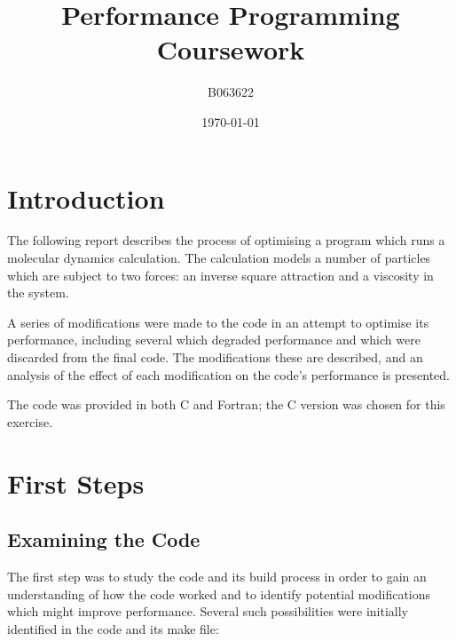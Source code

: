 \documentclass[11pt, oneside]{article}   %
\title{Performance Programming \\ Coursework}
\author{B063622}
\date{\today}
\begin{document}
\maketitle

\newpage

\tableofcontents

\newpage


\section{Introduction}
The following report describes the process of optimising a program which runs a molecular dynamics calculation.
The calculation models a number of particles which are subject to two forces: an inverse square attraction and a viscosity in the system.

A series of  modifications were made to the code in an attempt to optimise its performance, including several which degraded performance and which were discarded from the final code.
The modifications these are described, and an analysis of the effect of each modification on the code's performance is presented.

The code was provided in both C and Fortran; the C version was chosen for this exercise.

\section{First Steps}

\subsection{Examining the Code}
\label{subsec:ExaminingTheCode}

The first step was to study the code and its build process in order to gain an understanding of how the code worked and to identify potential modifications which might improve performance.
Several such possibilities were initially identified in the code and its make file:
\end{document}
